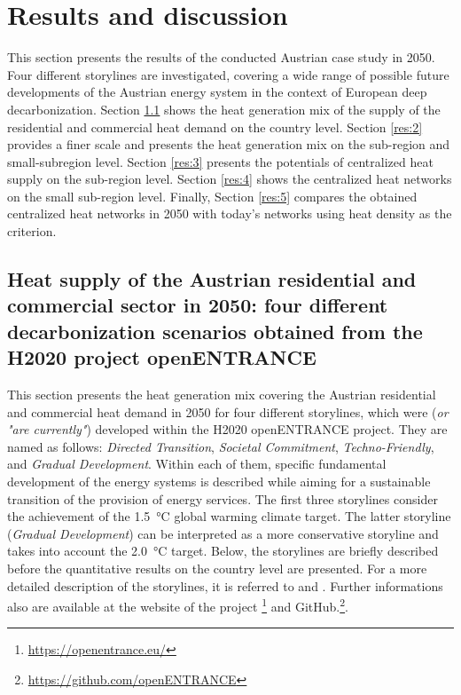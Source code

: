 \section{Results and discussion}\label{results}
This section presents the results of the conducted Austrian case study in 2050. Four different storylines are investigated, covering a wide range of possible future developments of the Austrian energy system in the context of European deep decarbonization. Section \ref{res:1} shows the heat generation mix of the supply of the residential and commercial heat demand on the country level. Section \ref{res:2} provides a finer scale and presents the heat generation mix on the sub-region and small-subregion level. Section \ref{res:3} presents the potentials of centralized heat supply on the sub-region level. Section \ref{res:4} shows the centralized heat networks on the small sub-region level. Finally, Section \ref{res:5} compares the obtained centralized heat networks in 2050 with today's networks using heat density as the criterion.

\subsection{Heat supply of the Austrian residential and commercial sector in 2050: four different decarbonization scenarios obtained from the H2020 project openENTRANCE}\label{res:1}
This section presents the heat generation mix covering the Austrian residential and commercial heat demand in 2050 for four different storylines, which were (\textit{or "are currently"}) developed within the H2020 openENTRANCE project. They are named as follows: \textit{Directed Transition}, \textit{Societal Commitment}, \textit{Techno-Friendly}, and \textit{Gradual Development}. Within each of them, specific fundamental development of the energy systems is described while aiming for a sustainable transition of the provision of energy services. The first three storylines consider the achievement of the \SI{1.5}{\degreeCelsius} global warming climate target. The latter storyline (\textit{Gradual Development}) can be interpreted as a more conservative storyline and takes into account the \SI{2.0}{\degreeCelsius} target. Below, the storylines are briefly described before the quantitative results on the country level are presented. For a more detailed description of the storylines, it is referred to \cite{auer2020quantitative} and \cite{auer2020development}. Further informations also are available at the website of the project \footnote{\url{https://openentrance.eu/}} and GitHub.\footnote{\url{https://github.com/openENTRANCE}}.\newline

